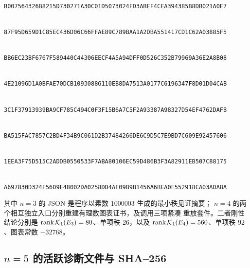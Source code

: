 \begingroup\scriptsize
\noindent{}\\
\nolinkurl{B007564326B8215D730271A30C01D5073024FD3ABEF4CEA394385B8DB021A0E7}\par
\smallskip
\noindent{}\\
\nolinkurl{87F95D659D1C85EC436D06C66FFAE89C789BAA1A2DBA551417CD1C62A03885F5}\par
\smallskip
\noindent{}\\
\nolinkurl{BB6EC23BF6767F589440C44306EECF4A5A94DFF0D526C352B79969A36E2A8B08}\par
\smallskip
\noindent{}\\
\nolinkurl{4E21096D1A0BFAE70DCB10930886110EB8DA7513A0177C6196347F8D01D04CAB}\par
\smallskip
\noindent{}\\
\nolinkurl{3C1F37913939BA9CF785C494C0F3F15B6A7C5F2A93387A98327D54EF4762DAFB}\par
\smallskip
\noindent{}\\
\nolinkurl{BA515FAC7857C2BD4F34B9C061D2B37484266DE6C9D5C7E9BD7C609E92457606}\par
\smallskip
\noindent{}\\
\nolinkurl{1EEA3F75D515C2ADDB0550533F7ABA80106EC59D486B3F3A82911EB507C88175}\par
\smallskip
\noindent{}\\
\nolinkurl{A697830D324F56D9F48002DA0258DD4AF09B9B1456A6BEA0F552918CA03ADA8A}\par
\endgroup

其中 $n=3$ 的 JSON 是程序以素数 $1000003$ 生成的最小秩见证摘要；
$n=4$ 的两个相互独立入口分别重建有理数图表证书，及调用三项紧凑
重放套件。二者刚性结论分别是
\(\operatorname{rank}\mathcal K_1(E_3)=80\)、单项秩 $26$，以及
\(\operatorname{rank}\mathcal K_1(E_4)=560\)、单项秩 $92$、图表常数
\(-32768\)。

\subsection{$n=5$ 的活跃诊断文件与 SHA--256}

